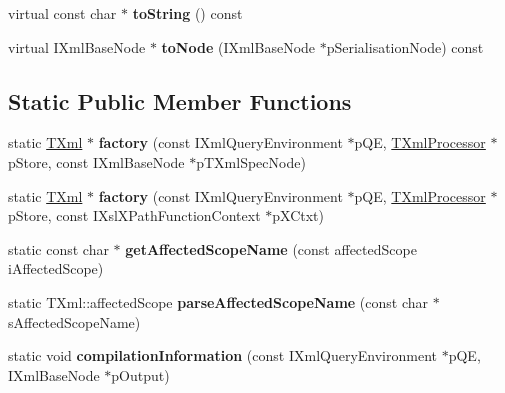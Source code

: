 \begin{DoxyCompactItemize}
\item 
\hypertarget{classgeneral__server_1_1TXml_a5dbc075b7dacbec6d72325c95522bf8a}{virtual const char $\ast$ {\bfseries to\-String} () const }\label{classgeneral__server_1_1TXml_a5dbc075b7dacbec6d72325c95522bf8a}

\item 
\hypertarget{classgeneral__server_1_1TXml_a60295c15a55ba79172389e4997ac2fb3}{virtual \-I\-Xml\-Base\-Node $\ast$ {\bfseries to\-Node} (\-I\-Xml\-Base\-Node $\ast$p\-Serialisation\-Node) const }\label{classgeneral__server_1_1TXml_a60295c15a55ba79172389e4997ac2fb3}

\end{DoxyCompactItemize}
\subsection*{\-Static \-Public \-Member \-Functions}
\begin{DoxyCompactItemize}
\item 
\hypertarget{classgeneral__server_1_1TXml_a0fa45347851780c5cacabfeef03ab48e}{static \hyperlink{classgeneral__server_1_1TXml}{\-T\-Xml} $\ast$ {\bfseries factory} (const \-I\-Xml\-Query\-Environment $\ast$p\-Q\-E, \hyperlink{classgeneral__server_1_1TXmlProcessor}{\-T\-Xml\-Processor} $\ast$p\-Store, const \-I\-Xml\-Base\-Node $\ast$p\-T\-Xml\-Spec\-Node)}\label{classgeneral__server_1_1TXml_a0fa45347851780c5cacabfeef03ab48e}

\item 
\hypertarget{classgeneral__server_1_1TXml_a7811e6f4fda46e0f1e5da6d3c2944af5}{static \hyperlink{classgeneral__server_1_1TXml}{\-T\-Xml} $\ast$ {\bfseries factory} (const \-I\-Xml\-Query\-Environment $\ast$p\-Q\-E, \hyperlink{classgeneral__server_1_1TXmlProcessor}{\-T\-Xml\-Processor} $\ast$p\-Store, const \-I\-Xsl\-X\-Path\-Function\-Context $\ast$p\-X\-Ctxt)}\label{classgeneral__server_1_1TXml_a7811e6f4fda46e0f1e5da6d3c2944af5}

\item 
\hypertarget{classgeneral__server_1_1TXml_a11f46ec97651f5c4509e3a518b37e969}{static const char $\ast$ {\bfseries get\-Affected\-Scope\-Name} (const affected\-Scope i\-Affected\-Scope)}\label{classgeneral__server_1_1TXml_a11f46ec97651f5c4509e3a518b37e969}

\item 
\hypertarget{classgeneral__server_1_1TXml_a90e63a1738567b106b5803086e8c0459}{static \-T\-Xml\-::affected\-Scope {\bfseries parse\-Affected\-Scope\-Name} (const char $\ast$s\-Affected\-Scope\-Name)}\label{classgeneral__server_1_1TXml_a90e63a1738567b106b5803086e8c0459}

\item 
\hypertarget{classgeneral__server_1_1TXml_a39a2656ddeceb5671ad66af4778655fa}{static void {\bfseries compilation\-Information} (const \-I\-Xml\-Query\-Environment $\ast$p\-Q\-E, \-I\-Xml\-Base\-Node $\ast$p\-Output)}\label{classgeneral__server_1_1TXml_a39a2656ddeceb5671ad66af4778655fa}

\end{DoxyCompactItemize}
